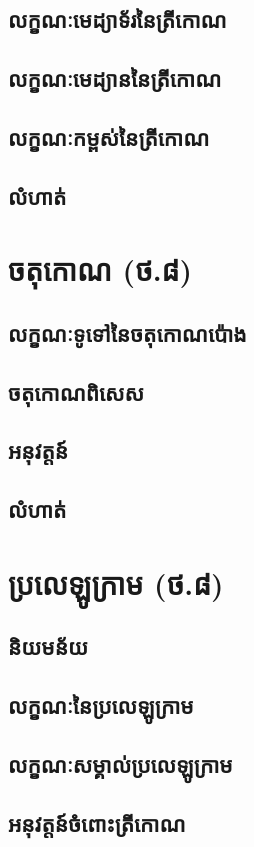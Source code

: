 \documentclass[a4paper,12pt,blue]{pptec}
\begin{document}
	\section{លក្ខណៈមេដ្យាទ័រនៃត្រីកោណ}
	\section{លក្ខណៈមេដ្យាននៃត្រីកោណ}
	\section{លក្ខណៈកម្ពស់នៃត្រីកោណ}
	\section{លំហាត់}
	\chapter{ចតុកោណ (ថ.៨)}
	\section{លក្ខណៈទូទៅនៃចតុកោណប៉ោង}
	\section{ចតុកោណពិសេស}
	\section{អនុវត្តន៍}
	\section{លំហាត់}
	\chapter{ប្រលេឡូក្រាម (ថ.៨)}
	\section{និយមន័យ}
	\section{លក្ខណៈនៃប្រលេឡូក្រាម}
	\section{លក្ខណៈសម្គាល់ប្រលេឡូក្រាម}
	\section{អនុវត្តន៍ចំពោះត្រីកោណ}
\end{document}
